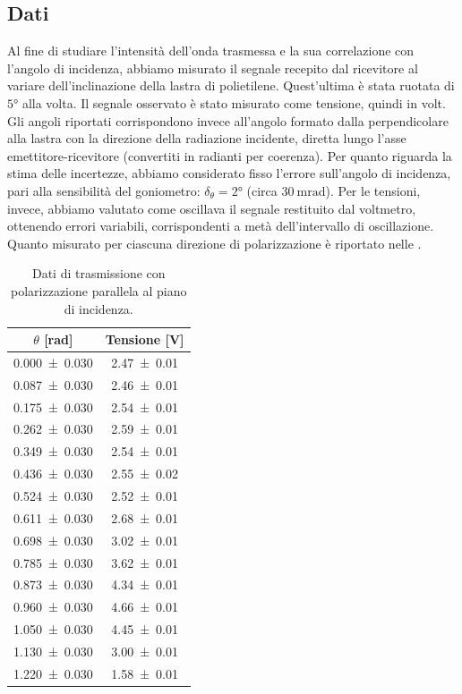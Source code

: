 \documentclass[a4paper]{article}
\begin{document}
\subsection{Dati}
Al fine di studiare l'intensità dell'onda trasmessa e la sua correlazione con l'angolo di incidenza, abbiamo misurato il segnale recepito dal ricevitore al variare dell'inclinazione della lastra di polietilene. Quest'ultima è stata ruotata di $\ang{5}$ alla volta. Il segnale osservato è stato misurato come tensione, quindi in volt. Gli angoli riportati corrispondono invece all'angolo formato dalla perpendicolare alla lastra con la direzione della radiazione incidente, diretta lungo l'asse emettitore-ricevitore (convertiti in radianti per coerenza). Per quanto riguarda la stima delle incertezze, abbiamo considerato fisso l'errore sull'angolo di incidenza, pari alla sensibilità del goniometro: $\delta_{\theta}=\ang{2}$ (circa $\SI{30}{\milli\radian}$). Per le tensioni, invece, abbiamo valutato come oscillava il segnale restituito dal voltmetro, ottenendo errori variabili, corrispondenti a metà dell'intervallo di oscillazione. Quanto misurato per ciascuna direzione di polarizzazione è riportato nelle .

\begin{table}[htbp]
\centering
\caption{Dati di trasmissione con polarizzazione parallela al piano di incidenza.}
\label{tab:brewster_par}
\begin{tabular}{|c|c|}
\hline
$\theta$ [\si{\radian}] & Tensione [\si{\volt}] \\\hline\hline
\SI{0.000 \pm 0.030}{} & \SI{2.47 \pm 0.01}{} \\
\SI{0.087 \pm 0.030}{} & \SI{2.46 \pm 0.01}{} \\
\SI{0.175 \pm 0.030}{} & \SI{2.54 \pm 0.01}{} \\
\SI{0.262 \pm 0.030}{} & \SI{2.59 \pm 0.01}{} \\
\SI{0.349 \pm 0.030}{} & \SI{2.54 \pm 0.01}{} \\
\SI{0.436 \pm 0.030}{} & \SI{2.55 \pm 0.02}{} \\
\SI{0.524 \pm 0.030}{} & \SI{2.52 \pm 0.01}{} \\
\SI{0.611 \pm 0.030}{} & \SI{2.68 \pm 0.01}{} \\
\SI{0.698 \pm 0.030}{} & \SI{3.02 \pm 0.01}{} \\
\SI{0.785 \pm 0.030}{} & \SI{3.62 \pm 0.01}{} \\
\SI{0.873 \pm 0.030}{} & \SI{4.34 \pm 0.01}{} \\
\SI{0.960 \pm 0.030}{} & \SI{4.66 \pm 0.01}{} \\
\SI{1.050 \pm 0.030}{} & \SI{4.45 \pm 0.01}{} \\
\SI{1.130 \pm 0.030}{} & \SI{3.00 \pm 0.01}{} \\
\SI{1.220 \pm 0.030}{} & \SI{1.58 \pm 0.01}{} \\
\hline
\end{tabular}
\end{table}
\end{document}
